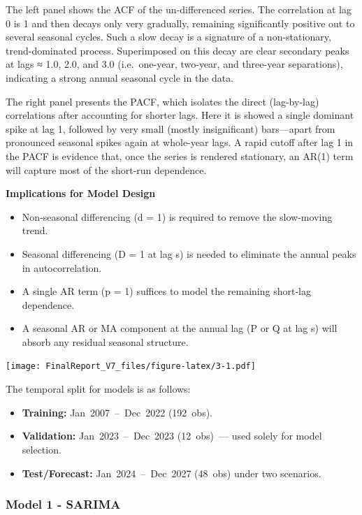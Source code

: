 \documentclass[
]{article}
\providecommand{\tightlist}{%
  \setlength{\itemsep}{0pt}\setlength{\parskip}{0pt}}
\begin{document}
The left panel shows the ACF of the un‐differenced series. The
correlation at lag 0 is 1 and then decays only very gradually, remaining
significantly positive out to several seasonal cycles. Such a slow decay
is a signature of a non-stationary, trend-dominated process.
Superimposed on this decay are clear secondary peaks at lags ≈ 1.0, 2.0,
and 3.0 (i.e.~one-year, two-year, and three-year separations),
indicating a strong annual seasonal cycle in the data.

The right panel presents the PACF, which isolates the direct
(lag-by-lag) correlations after accounting for shorter lags. Here it is
showed a single dominant spike at lag 1, followed by very small (mostly
insignificant) bars---apart from pronounced seasonal spikes again at
whole-year lags. A rapid cutoff after lag 1 in the PACF is evidence
that, once the series is rendered stationary, an AR(1) term will capture
most of the short‐run dependence.

\textbf{Implications for Model Design}

\begin{itemize}
\item
  Non‐seasonal differencing (d = 1) is required to remove the
  slow-moving trend.
\item
  Seasonal differencing (D = 1 at lag s) is needed to eliminate the
  annual peaks in autocorrelation.
\item
  A single AR term (p = 1) suffices to model the remaining short‐lag
  dependence.
\item
  A seasonal AR or MA component at the annual lag (P or Q at lag s) will
  absorb any residual seasonal structure.
\end{itemize}

\texttt{[image: FinalReport\_V7\_files/figure-latex/3-1.pdf]}

The temporal split for models is as follows:

\begin{itemize}
\tightlist
\item
  \textbf{Training:} Jan~2007~--~Dec~2022 (192~obs).
\item
  \textbf{Validation:} Jan~2023~--~Dec~2023 (12~obs)~--- used solely for
  model selection.
\item
  \textbf{Test/Forecast:} Jan~2024~--~Dec~2027 (48~obs) under two
  scenarios.
\end{itemize}

\subsubsection{Model 1 - SARIMA}\label{model-1---sarima}
\end{document}

